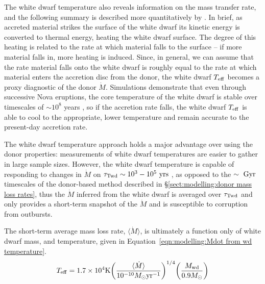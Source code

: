 The white dwarf temperature also reveals information on the mass transfer rate, and the following summary is described more quantitatively by \citet{townsley2009}.
In brief, as accreted material strikes the surface of the white dwarf its kinetic energy is converted to thermal energy, heating the white dwarf surface.
The degree of this heating is related to the rate at which material falls to the surface -- if more material falls in, more heating is induced.
Since, in general, we can assume that the rate material falls onto the white dwarf is roughly equal to the rate at which material enters the accretion disc from the donor, the white dwarf $T_{\rm eff}$ becomes a proxy diagnostic of the donor $\dot M$.
Simulations demonstrate that even through successive Nova eruptions, the core temperature of the white dwarf is stable over timescales of $\sim 10^8$ years \citep{epelstain2007}, so if the accretion rate falls, the white dwarf $T_{\rm eff}$ is able to cool to the appropriate, lower temperature and remain accurate to the present-day accretion rate.

The white dwarf temperature approach holds a major advantage over using the donor properties: measurements of white dwarf temperatures are easier to gather in large sample sizes.
However, the white dwarf temperature is capable of responding to changes in $\dot M$ on $\tau_{\rm Twd} \sim 10^3 - 10^5\ {\rm yrs}$ \citep{townsley2009}, as opposed to the $\rm \sim~Gyr$ timescales of the donor-based method described in \S\ref{sect:modelling:donor mass loss rates}, thus the $\dot M$ inferred from the white dwarf is averaged over $\tau_{\rm Twd}$ and only provides a short-term snapshot of the $\dot M$ and is susceptible to corruption from outbursts.

The short-term average mass loss rate, $\langle\dot M\rangle$, is ultimately a function only of white dwarf mass, and temperature, given in Equation~\ref{eqn:modelling:Mdot from wd temperature}.
\begin{equation}
    \label{eqn:modelling:Mdot from wd temperature}
    T_{\rm eff} = 1.7 \times 10^4 {\rm K} \bigg( \frac{\langle\dot M\rangle}{10^{-10} M_\odot {\rm yr}^{-1}} \bigg)^{1/4} \bigg( \frac{M_{\rm wd}}{0.9 M_\odot} \bigg)
\end{equation}


